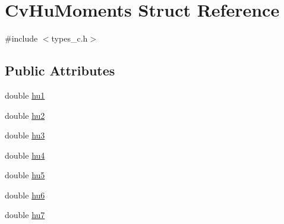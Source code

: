 \hypertarget{structCvHuMoments}{\section{Cv\-Hu\-Moments Struct Reference}
\label{structCvHuMoments}
}


{\ttfamily \#include $<$types\-\_\-c.\-h$>$}

\subsection*{Public Attributes}
\begin{DoxyCompactItemize}
\item 
double \hyperlink{structCvHuMoments_aa450f3037cf35f767b4159b67e6adb8f}{hu1}
\item 
double \hyperlink{structCvHuMoments_a1f87365eec104c58b5bf26e36fed7f0e}{hu2}
\item 
double \hyperlink{structCvHuMoments_a44baeeb2c6cef51d5000fa1bd21777aa}{hu3}
\item 
double \hyperlink{structCvHuMoments_a3eb32d23887e8da1425f412b514cb98d}{hu4}
\item 
double \hyperlink{structCvHuMoments_a9a03659c41d3bca145239fee5334a9bf}{hu5}
\item 
double \hyperlink{structCvHuMoments_a1a16e0bde3e4b3b5f5245240c76f3387}{hu6}
\item 
double \hyperlink{structCvHuMoments_ab50830c8592726d4b0d12b6a1d60e6cc}{hu7}
\end{DoxyCompactItemize}


